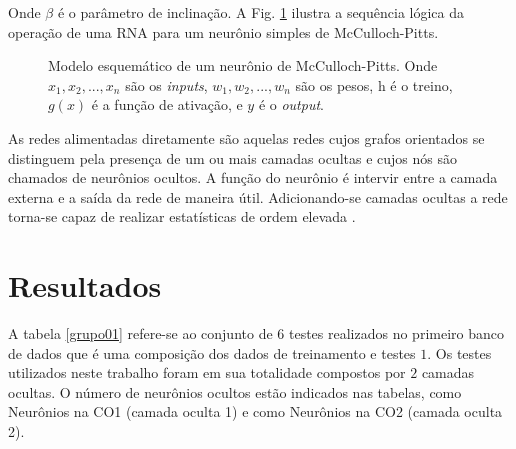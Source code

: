 \documentclass[journal, a4paper]{IEEEtran}
\begin{document}
Onde $\beta$ é o parâmetro de inclinação. A Fig. \ref{Esquematico de McCulloch} ilustra a sequência lógica da operação de uma RNA para um neurônio simples de McCulloch-Pitts. 
\\
\begin{figure}[ht]
	\centering
	\setlength{\fboxsep}{8pt}
	\setlength{\fboxrule}{0.1pt}
	\caption{Modelo esquemático de um neurônio de McCulloch-Pitts. Onde $x_{1}, x_{2}, ..., x_{n}$ são os \textit{inputs}, $w_{1}, w_{2}, ..., w_{n}$ são os pesos, h é o treino, $g(x)$ é a função de ativação, e $y$ é o \textit{output}.}
	\label{Esquematico de McCulloch}
\end{figure}

As redes alimentadas diretamente são aquelas redes cujos grafos orientados se distinguem pela presença de um ou mais camadas ocultas e cujos nós são chamados de neurônios ocultos. A função do neurônio é intervir entre a camada externa e a saída da rede de maneira útil. Adicionando-se camadas ocultas a rede torna-se capaz de realizar estatísticas de ordem elevada \citep{Haykin1999}.


\section{Resultados}

A tabela \ref{grupo01} refere-se ao conjunto de $6$ testes realizados no primeiro banco de dados que é uma composição dos dados de treinamento e testes $1$. Os testes utilizados neste trabalho foram em sua totalidade compostos por $2$ camadas ocultas. O número de neurônios ocultos estão indicados nas tabelas, como Neurônios na CO1 (camada oculta 1) e como Neurônios na CO2 (camada oculta 2).
\end{document}
